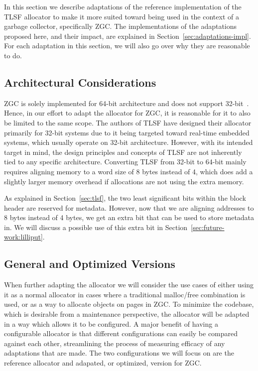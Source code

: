 In this section we describe adaptations of the reference implementation of the TLSF allocator to make it more suited toward being used in the context of a garbage collector, specifically ZGC. The implementations of the adaptations proposed here, and their impact, are explained in Section~\ref{sec:adaptations-impl}. For each adaptation in this section, we will also go over why they are reasonable to do.

\subsection{Architectural Considerations}
\label{sec:adaptations:architectural-considerations}

ZGC is solely implemented for 64-bit architecture and does not support 32-bit~\cite{zgc_deep_dive}. Hence, in our effort to adapt the allocator for ZGC, it is reasonable for it to also be limited to the same scope. The authors of TLSF have designed their allocator primarily for 32-bit systems due to it being targeted toward real-time embedded systems, which usually operate on 32-bit architecture. However, with its intended target in mind, the design principles and concepts of TLSF are not inherently tied to any specific architecture. Converting TLSF from 32-bit to 64-bit mainly requires aligning memory to a word size of 8 bytes instead of 4, which does add a slightly larger memory overhead if allocations are not using the extra memory.

As explained in Section~\ref{sec:tlsf}, the two least significant bits within the block header are reserved for metadata. However, now that we are aligning addresses to 8 bytes instead of 4 bytes, we get an extra bit that can be used to store metadata in. We will discuss a possible use of this extra bit in Section~\ref{sec:future-work:lilliput}.

\subsection{General and Optimized Versions}

When further adapting the allocator we will consider the use cases of either using it as a normal allocator in cases where a traditional malloc/free combination is used, or as a way to allocate objects on pages in ZGC. To minimize the codebase, which is desirable from a maintenance perspective, the allocator will be adapted in a way which allows it to be configured. A major benefit of having a configurable allocator is that different configurations can easily be compared against each other, streamlining the process of measuring efficacy of any adaptations that are made. The two configurations we will focus on are the reference allocator and adapated, or optimized, version for ZGC.


